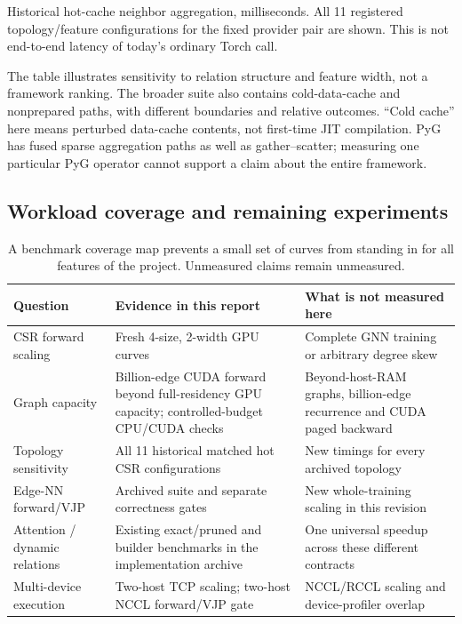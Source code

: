 \begin{table}[ht]
\centering\small

\caption{Historical hot-cache neighbor aggregation, milliseconds. All 11
registered topology/feature configurations for the fixed provider pair are shown.
This is not end-to-end latency of today's ordinary Torch call.}
\label{tab:weighted}
\end{table}

The table illustrates sensitivity to relation structure and feature width, not a
framework ranking. The broader suite also contains cold-data-cache and nonprepared
paths, with different boundaries and relative outcomes. ``Cold cache'' here means
perturbed data-cache contents, not first-time JIT compilation. PyG has fused sparse
aggregation paths as well as gather--scatter; measuring one particular PyG operator
cannot support a claim about the entire framework.

\subsection{Workload coverage and remaining experiments}
\begin{table}[ht]
\centering\small
\begin{tabularx}{\linewidth}{l Y Y}
\toprule
Question & Evidence in this report & What is not measured here \\
\midrule
CSR forward scaling & Fresh 4-size, 2-width GPU curves & Complete GNN training or arbitrary degree skew \\
Graph capacity & Billion-edge CUDA forward beyond full-residency GPU capacity; controlled-budget CPU/CUDA checks & Beyond-host-RAM graphs, billion-edge recurrence and CUDA paged backward \\
Topology sensitivity & All 11 historical matched hot CSR configurations & New timings for every archived topology \\
Edge-NN forward/VJP & Archived suite and separate correctness gates & New whole-training scaling in this revision \\
Attention / dynamic relations & Existing exact/pruned and builder benchmarks in the implementation archive & One universal speedup across these different contracts \\
Multi-device execution & Two-host TCP scaling; two-host NCCL forward/VJP gate & NCCL/RCCL scaling and device-profiler overlap \\
\bottomrule
\end{tabularx}
\caption{A benchmark coverage map prevents a small set of curves from standing
in for all features of the project. Unmeasured claims remain unmeasured.}
\end{table}

